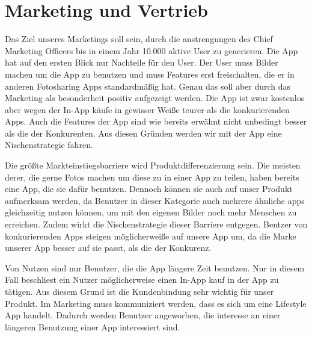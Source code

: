 \chapter{Marketing und Vertrieb}
Das Ziel unseres Marketings soll sein, durch die anstrengungen des Chief Marketing Officers bis in einem Jahr 10.000 aktive User zu generieren.
Die App hat auf den ersten Blick nur Nachteile für den User. Der User muss Bilder machen um die App zu benutzen und muss Features erst freischalten, die er in anderen Fotosharing Apps standardmäßig hat. Genau das soll aber durch das Marketing als besonderheit positiv aufgezeigt werden.
Die App ist zwar kostenlos aber wegen der In-App käufe in gewisser Weiße teurer als die konkurierenden Apps. Auch die Features der App sind wie bereits erwähnt nicht unbedingt besser als die der Konkurenten. Aus diesen Gründen werden wir mit der App eine Nischenstrategie fahren.

Die größte Markteinstiegsbarriere wird Produktdifferenzierung sein. Die meisten derer, die gerne Fotos machen um diese zu in einer App zu teilen, haben bereits eine App, die sie dafür benutzen. Dennoch können sie auch auf unser Produkt aufmerksam werden, da Benutzer in dieser Kategorie auch mehrere ähnliche apps gleichzeitig nutzen können, um mit den eigenen Bilder noch mehr Menschen zu erreichen.
Zudem wirkt die Nischenstrategie dieser Barriere entgegen. Bentzer von konkurierenden Apps steigen möglicherweiße auf unsere App um, da die Marke unserer App besser auf sie passt, als die der Konkurenz.

Von Nutzen sind nur Benutzer, die die App längere Zeit benutzen. Nur in diesem Fall beschliest ein Nutzer möglicherweise einen In-App kauf in der App zu tätigen. Aus diesem Grund ist die Kundenbindung sehr wichtig für unser Produkt. Im Marketing muss kommuniziert werden, dass es sich um eine Lifestyle App handelt. Dadurch werden Benutzer angeworben, die interesse an einer längeren Benutzung einer App interessiert sind.

